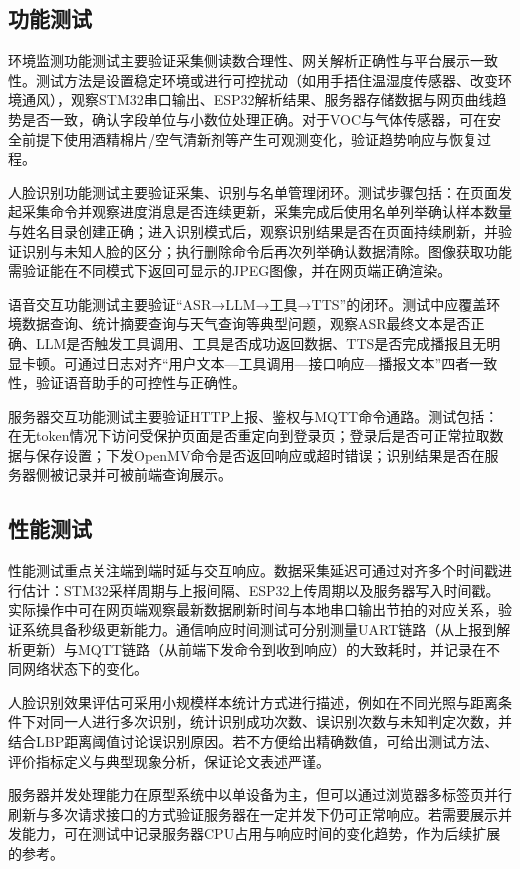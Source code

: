 \subsection{功能测试}
\par 环境监测功能测试主要验证采集侧读数合理性、网关解析正确性与平台展示一致性。测试方法是设置稳定环境或进行可控扰动（如用手捂住温湿度传感器、改变环境通风），观察STM32串口输出、ESP32解析结果、服务器存储数据与网页曲线趋势是否一致，确认字段单位与小数位处理正确。对于VOC与气体传感器，可在安全前提下使用酒精棉片/空气清新剂等产生可观测变化，验证趋势响应与恢复过程。
\par 人脸识别功能测试主要验证采集、识别与名单管理闭环。测试步骤包括：在页面发起采集命令并观察进度消息是否连续更新，采集完成后使用名单列举确认样本数量与姓名目录创建正确；进入识别模式后，观察识别结果是否在页面持续刷新，并验证识别与未知人脸的区分；执行删除命令后再次列举确认数据清除。图像获取功能需验证能在不同模式下返回可显示的JPEG图像，并在网页端正确渲染。
\par 语音交互功能测试主要验证“ASR→LLM→工具→TTS”的闭环。测试中应覆盖环境数据查询、统计摘要查询与天气查询等典型问题，观察ASR最终文本是否正确、LLM是否触发工具调用、工具是否成功返回数据、TTS是否完成播报且无明显卡顿。可通过日志对齐“用户文本—工具调用—接口响应—播报文本”四者一致性，验证语音助手的可控性与正确性。
\par 服务器交互功能测试主要验证HTTP上报、鉴权与MQTT命令通路。测试包括：在无token情况下访问受保护页面是否重定向到登录页；登录后是否可正常拉取数据与保存设置；下发OpenMV命令是否返回响应或超时错误；识别结果是否在服务器侧被记录并可被前端查询展示。

\subsection{性能测试}
\par 性能测试重点关注端到端时延与交互响应。数据采集延迟可通过对齐多个时间戳进行估计：STM32采样周期与上报间隔、ESP32上传周期以及服务器写入时间戳。实际操作中可在网页端观察最新数据刷新时间与本地串口输出节拍的对应关系，验证系统具备秒级更新能力。通信响应时间测试可分别测量UART链路（从上报到解析更新）与MQTT链路（从前端下发命令到收到响应）的大致耗时，并记录在不同网络状态下的变化。
\par 人脸识别效果评估可采用小规模样本统计方式进行描述，例如在不同光照与距离条件下对同一人进行多次识别，统计识别成功次数、误识别次数与未知判定次数，并结合LBP距离阈值讨论误识别原因。若不方便给出精确数值，可给出测试方法、评价指标定义与典型现象分析，保证论文表述严谨。
\par 服务器并发处理能力在原型系统中以单设备为主，但可以通过浏览器多标签页并行刷新与多次请求接口的方式验证服务器在一定并发下仍可正常响应。若需要展示并发能力，可在测试中记录服务器CPU占用与响应时间的变化趋势，作为后续扩展的参考。


